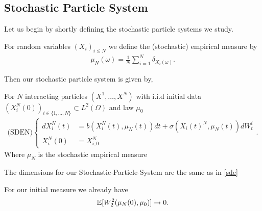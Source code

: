 \subsection{Stochastic Particle System}
Let us begin by shortly defining the stochastic particle systems we study. 
\begin{definition}\label{empirical_stochastic}
  For random variables $(X_i)_{i\le N}$  we define the (stochastic) empirical measure by
  \begin{align*}
    \mu_N(\omega ) = \frac{1}{N}\sum_{i=1}^{N} \delta_{X_i(\omega)} 
  .\end{align*}
\end{definition}
Then our stochastic particle system is given by,
\begin{definition}\label{sden}
  For $N$ interacting particles $(X^{1} ,\ldots ,X^{N} )$ with i.i.d initial data $(X_i^{N}(0))_{i \in  \{1,\ldots ,N\}  } \subset  L^2(\Omega) $ and law $\mu_0$
\begin{align*}
  \text{(SDEN)}\begin{cases}
    d X_i^{N}(t) &=   b(X_i^{N}(t) , \mu_N(t) )dt + \sigma(X_i(t)^{N},\mu_N(t))dW^{i}_t \\
    X_i^{N}(0) &= X_{i,0}^{N}   
  \end{cases}
.\end{align*}
Where $\mu_N$ is the stochastic empirical measure
\end{definition}
\begin{remark}
  The dimensions for our Stochastic-Particle-System are the same as in \autoref{sde}
\end{remark}
\begin{remark}
  For our initial measure we already have
\begin{align*}
  \mathbb{E}[W_2^{2}(\mu_N(0),\mu_0) ] \to  0
.\end{align*}
\end{remark}
